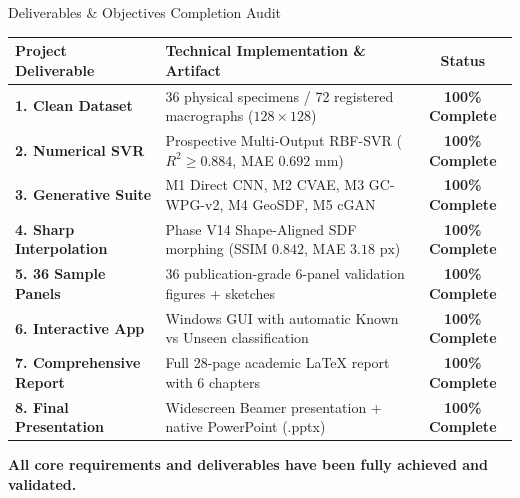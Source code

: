 \documentclass[aspectratio=169]{beamer}
\begin{document}
\begin{frame}{Deliverables \& Objectives Completion Audit}
	\begin{table}
		\centering
		\scriptsize
		\begin{tabular}{p{3.5cm}p{6.8cm}c}
			\toprule
			\textbf{Project Deliverable} & \textbf{Technical Implementation \& Artifact} & \textbf{Status} \\
			\midrule
			\textbf{1. Clean Dataset} & 36 physical specimens / 72 registered macrographs ($128\times 128$) & \textbf{100\% Complete} \\
			\textbf{2. Numerical SVR} & Prospective Multi-Output RBF-SVR ($R^2 \ge 0.884$, MAE $0.692\text{ mm}$) & \textbf{100\% Complete} \\
			\textbf{3. Generative Suite} & M1 Direct CNN, M2 CVAE, M3 GC-WPG-v2, M4 GeoSDF, M5 cGAN & \textbf{100\% Complete} \\
			\textbf{4. Sharp Interpolation} & Phase V14 Shape-Aligned SDF morphing (SSIM $0.842$, MAE $3.18\text{ px}$) & \textbf{100\% Complete} \\
			\textbf{5. 36 Sample Panels} & 36 publication-grade 6-panel validation figures + sketches & \textbf{100\% Complete} \\
			\textbf{6. Interactive App} & Windows GUI with automatic Known vs Unseen classification & \textbf{100\% Complete} \\
			\textbf{7. Comprehensive Report} & Full 28-page academic LaTeX report with 6 chapters & \textbf{100\% Complete} \\
			\textbf{8. Final Presentation} & Widescreen Beamer presentation + native PowerPoint (.pptx) & \textbf{100\% Complete} \\
			\bottomrule
		\end{tabular}
	\end{table}
	\vspace{0.2cm}
	\begin{center}
		\textbf{\color{blue!80!black}All core requirements and deliverables have been fully achieved and validated.}
	\end{center}
\end{frame}
\end{document}
